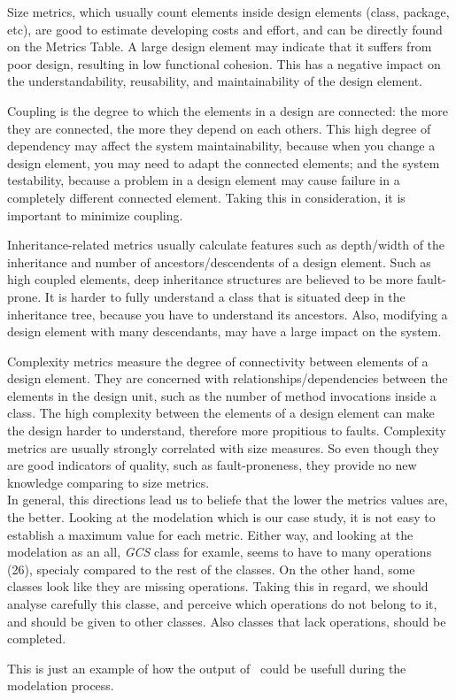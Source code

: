Size metrics, which usually count elements inside design elements (class, package, etc), are good to estimate developing costs and effort, and can be directly found on the Metrics Table.
A large design element may indicate that it suffers from poor design, resulting in low functional cohesion. This has a negative impact on the understandability, reusability, and maintainability of the design element.

Coupling is the degree to which the elements in a design are connected: the more they are connected, the more they depend on each others. This high degree of dependency may affect the system maintainability, because when you change a design element, you may need to adapt the connected elements; and the system testability, because a problem in a design element may cause failure in a completely different connected element. Taking this in consideration, it is important to minimize coupling.

Inheritance-related metrics usually calculate features such as depth/width of the inheritance and number of ancestors/descendents of a design element. Such as high coupled elements, deep inheritance structures are believed to be more fault-prone. It is harder to fully understand a class that is situated deep in the inheritance tree, because you have to understand its ancestors. Also, modifying a design element with many descendants, may have a large impact on the system.

Complexity metrics measure the degree of connectivity between elements of a design element. They are concerned with relationships/dependencies between the elements in the design unit, such as the number of method invocations inside a class. The high complexity between the elements of a design element can make the design harder to understand, therefore more propitious to faults. Complexity metrics are usually strongly correlated with size measures. So even though they are good indicators of quality, such as fault-proneness, they provide no new knowledge comparing to size metrics.\\

In general, this directions lead us to beliefe that the lower the metrics values are, the better. Looking at the modelation which is our case study, it is not easy to establish  a maximum value for each metric. Either way, and looking at the modelation as an all, \textit{GCS} class for examle, seems to have to many operations (26), specialy compared to the rest of the classes. On the other hand, some classes look like they are missing operations. Taking this in regard, we should analyse carefully this classe, and perceive which operations do not belong to it, and should be given to other classes. Also classes that lack operations, should be completed.

This is just an example of how the output of \sdmetrics\ could be usefull during the modelation process.
